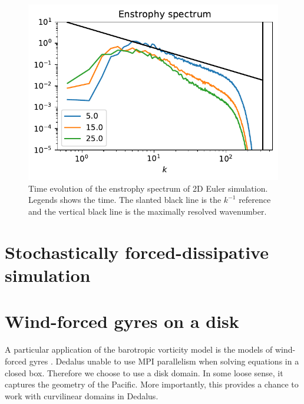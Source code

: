 \begin{figure}
    \centering
    \includegraphics{2DEuler_spec}
    \caption{Time evolution of the enstrophy spectrum of 2D Euler simulation. Legends shows the time. The slanted black line is the $k^{-1}$ reference and the vertical black line is the maximally resolved wavenumber.}
    \label{fig:2DEuler_spec}
\end{figure}


\section{Stochastically forced-dissipative simulation}


\section{Wind-forced gyres on a disk}
A particular application of the barotropic vorticity model is the models of wind-forced gyres \cite[\S 19.1.2.I]{Vallis_17}. Dedalus unable to use MPI parallelism when solving equations in a closed box. Therefore we choose to use a disk domain. In some loose sense, it captures the geometry of the Pacific. More importantly, this provides a chance to work with curvilinear domains in Dedalus.

